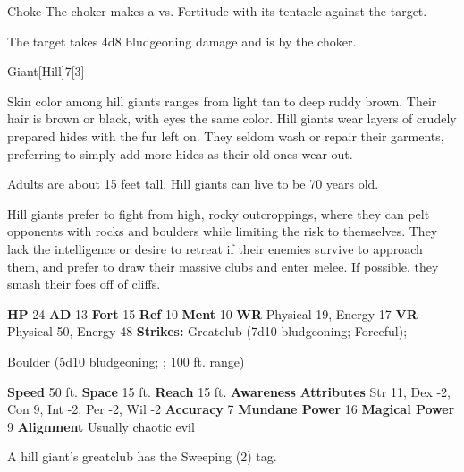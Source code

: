     \begin{freeability}{Choke}
       The choker makes a 
         vs. Fortitude
        with its tentacle against the target.
    
    \hit The target takes 4d8 bludgeoning damage and is  by the choker.
    \end{freeability}
  
  \begin{monsection}{Giant}[Hill]{7}[3]
    \vspace{-1em}\vspace{-1em}
    \vspace{0em}

    
      Skin color among hill giants ranges from light tan to deep ruddy brown. Their hair is brown or black, with eyes the same color. Hill giants wear layers of crudely prepared hides with the fur left on. They seldom wash or repair their garments, preferring to simply add more hides as their old ones wear out.

      Adults are about 15 feet tall. Hill giants can live to be 70 years old.
    
      Hill giants prefer to fight from high, rocky outcroppings, where they can pelt opponents with rocks and boulders while limiting the risk to themselves.
      They lack the intelligence or desire to retreat if their enemies survive to approach them, and prefer to draw their massive clubs and enter melee.
      If possible, they smash their foes off of cliffs.
    

    \begin{spellcontent}
      \begin{spelltargetinginfo}
        \pari \textbf{HP} 24 \monsep
          \textbf{AD} 13 \monsep
          \textbf{Fort} 15 \monsep
          \textbf{Ref} 10 \monsep
          \textbf{Ment} 10
        \pari \textbf{WR} Physical 19, Energy 17 \monsep
        \textbf{VR} Physical 50, Energy 48
        \pari \textbf{Strikes:}
            Greatclub  (7d10 bludgeoning; Forceful);
\par Boulder  (5d10 bludgeoning; ; 100 ft. range)
      \end{spelltargetinginfo}
    \end{spellcontent}
    \begin{monsterfooter}
      \pari \textbf{Speed} 50 ft. \monsep
        \textbf{Space} 15 ft. \monsep
        \textbf{Reach} 15 ft.
      \pari \textbf{Awareness} 
      \pari \textbf{Attributes}
        Str 11, Dex -2,
        Con 9, Int -2,
        Per -2, Wil -2
      \pari \textbf{Accuracy} 7 \monsep
        \textbf{Mundane Power} 16 \monsep
      \textbf{Magical Power} 9
      \pari \textbf{Alignment} Usually chaotic evil
    \end{monsterfooter}
  \end{monsection}
   A hill giant's greatclub has the Sweeping (2) tag.
  

